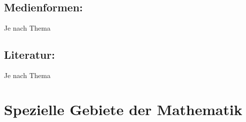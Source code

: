 \section*{Medienformen:}\label{medienformen-1}

Je nach Thema

\section*{Literatur:}\label{literatur-1}

Je nach Thema

\chapter{Spezielle Gebiete der
Mathematik}\label{spezielle-gebiete-der-mathematik}

